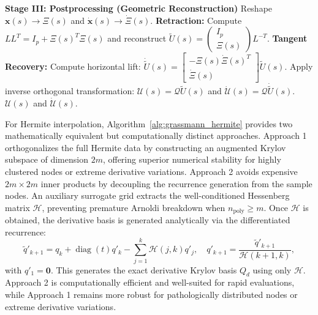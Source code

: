 \documentclass[11pt]{article}
\begin{document}
\begin{algorithm}[H]
\begin{algorithmic}[1]
\medskip
\STATE \textbf{Stage III: Postprocessing (Geometric Reconstruction)}
\STATE Reshape $\mathbf{x}(s) \to \Xi(s)$ and $\dot{\mathbf{x}}(s) \to \dot{\Xi}(s)$.
\STATE \textbf{Retraction:} Compute $LL^T = I_p + \Xi(s)^T \Xi(s)$ and reconstruct $\widetilde U(s) = \begin{pmatrix} I_p \\ \Xi(s) \end{pmatrix} L^{-T}$.
\STATE \textbf{Tangent Recovery:} Compute horizontal lift: $\dot{\widetilde U}(s) = \begin{bmatrix} -\Xi(s)\dot\Xi(s)^T \\ \dot\Xi(s) \end{bmatrix} \widetilde U(s)$.
\STATE Apply inverse orthogonal transformation: $\mathcal{U}(s) = \mathcal{Q} \widetilde U(s)$ and $\dot{\mathcal{U}}(s) = \mathcal{Q} \dot{\widetilde U}(s)$.
\RETURN $\mathcal{U}(s)$ and $\dot{\mathcal{U}}(s)$.
\end{algorithmic}
\end{algorithm}
 


For Hermite interpolation, Algorithm~\ref{alg:grassmann_hermite} provides two mathematically equivalent but computationally distinct approaches. Approach 1 orthogonalizes the full Hermite data by constructing an augmented Krylov subspace of dimension $2m$, offering superior numerical stability for highly clustered nodes or extreme derivative variations. Approach 2 avoids expensive $2m \times 2m$ inner products by decoupling the recurrence generation from the sample nodes. An auxiliary surrogate grid extracts the well-conditioned Hessenberg matrix $\mathcal{H}$, preventing premature Arnoldi breakdown when $n_{\text{poly}} \ge m$. Once $\mathcal{H}$ is obtained, the derivative basis is generated analytically via the differentiated recurrence:
\begin{equation}\label{eq:diff-recurrence}
    \tilde{q}'_{k+1} = q_k + \operatorname{diag}(t) q'_k - \sum_{j=1}^k \mathcal{H}(j,k) q'_j, \quad q'_{k+1} = \frac{\tilde{q}'_{k+1}}{\mathcal{H}(k+1,k)},
\end{equation}
with $q'_1 = \mathbf{0}$. This generates the exact derivative Krylov basis $Q_d$ using only $\mathcal{H}$.
Approach 2 is computationally efficient and well-suited for rapid evaluations, while Approach 1 remains more robust for pathologically distributed nodes or extreme derivative variations.
 
\end{document}
